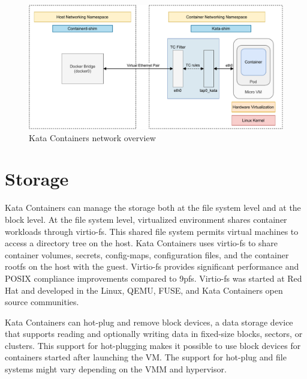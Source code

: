\begin{figure}[ht]
  \begin{center}
    \includegraphics[width=13.5cm]{images/KataContainersNetwork.pdf}
    \caption{Kata Containers network overview \cite{KataContainersArchitecture}}
    \label{fig:KataContainersNetwork}
  \end{center}
\end{figure}

\section{Storage}

Kata Containers can manage the storage both at the file system level and at the block level. At the file system level, virtualized environment shares container workloads through virtio-fs. This shared file system permits virtual machines to access a directory tree on the host. Kata Containers uses virtio-fs to share container volumes, secrets, config-maps, configuration files, and the container rootfs on the host with the guest. Virtio-fs provides significant performance and POSIX compliance improvements compared to 9pfs. Virtio-fs was started at Red Hat and developed in the Linux, QEMU, FUSE, and Kata Containers open source communities. \cite{virtio-fs-Kata}\cite{virtio-fs}

Kata Containers can hot-plug and remove block devices, a data storage device that supports reading and optionally writing data in fixed-size blocks, sectors, or clusters. This support for hot-plugging makes it possible to use block devices for containers started after launching the VM. The support for hot-plug and file systems might vary depending on the VMM and hypervisor. \cite{KataContainersArchitecture}\cite{KataContainersVirtualization}


